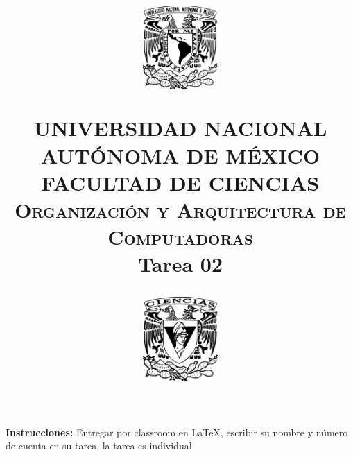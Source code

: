 \documentclass[12pt,letterpaper]{article}
\title{
		\vspace{-0.7in} 	
		\usefont{OT1}{bch}{b}{n}
		\begin{minipage}{3cm}
        \vspace{-0.5in} 	
    	\begin{center}
    		\includegraphics[height=3.2cm]{logo_unam.png}
    	\end{center}
    \end{minipage}\hfill
    \begin{minipage}{10.7cm}
    
    	\begin{center}
\normalfont \normalsize \textsc{UNIVERSIDAD NACIONAL AUTÓNOMA DE MÉXICO \\ FACULTAD DE CIENCIAS \\ Organización y Arquitectura de Computadoras } \\
		\huge Tarea 02
    	\end{center}
     
    \end{minipage}\hfill
    \begin{minipage}{3.2cm}
    \vspace{-0.5in} 
    	\begin{center}
    		\includegraphics[height=3.2cm]{logo_fc.png}
    	\end{center}
    \end{minipage}

\author{}
\date{}
}
\begin{document}
\maketitle

\textbf{Instrucciones:} Entregar por classroom en \LaTeX, escribir su nombre y número de cuenta en su tarea, la tarea es individual.\\

% 

\end{document}
